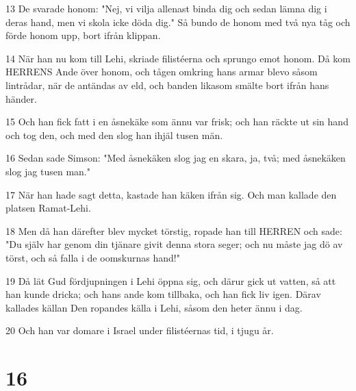 \par 13 De svarade honom: "Nej, vi vilja allenast binda dig och sedan lämna dig i deras hand, men vi skola icke döda dig." Så bundo de honom med två nya tåg och förde honom upp, bort ifrån klippan.
\par 14 När han nu kom till Lehi, skriade filistéerna och sprungo emot honom. Då kom HERRENS Ande över honom, och tågen omkring hans armar blevo såsom lintrådar, när de antändas av eld, och banden likasom smälte bort ifrån hans händer.
\par 15 Och han fick fatt i en åsnekäke som ännu var frisk; och han räckte ut sin hand och tog den, och med den slog han ihjäl tusen män.
\par 16 Sedan sade Simson: "Med åsnekäken slog jag en skara, ja, två; med åsnekäken slog jag tusen man."
\par 17 När han hade sagt detta, kastade han käken ifrån sig. Och man kallade den platsen Ramat-Lehi.
\par 18 Men då han därefter blev mycket törstig, ropade han till HERREN och sade: "Du själv har genom din tjänare givit denna stora seger; och nu måste jag dö av törst, och så falla i de oomskurnas hand!"
\par 19 Då lät Gud fördjupningen i Lehi öppna sig, och därur gick ut vatten, så att han kunde dricka; och hans ande kom tillbaka, och han fick liv igen. Därav kallades källan Den ropandes källa i Lehi, såsom den heter ännu i dag.
\par 20 Och han var domare i Israel under filistéernas tid, i tjugu år.

\chapter{16}

